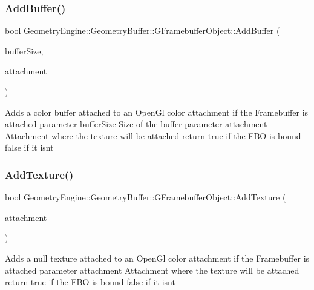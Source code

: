 \subsubsection{\texorpdfstring{AddBuffer()}{AddBuffer()}}
{\footnotesize\ttfamily bool Geometry\+Engine\+::\+Geometry\+Buffer\+::\+G\+Framebuffer\+Object\+::\+Add\+Buffer (\begin{DoxyParamCaption}\item[{const Q\+Vector2D \&}]{buffer\+Size,  }\item[{G\+Framebuffer\+Commons\+::\+G\+\_\+\+C\+O\+L\+O\+R\+\_\+\+A\+T\+T\+A\+C\+H\+M\+E\+N\+TS}]{attachment }\end{DoxyParamCaption})}

Adds a color buffer attached to an Open\+Gl color attachment if the Framebuffer is attached parameter buffer\+Size Size of the buffer parameter attachment Attachment where the texture will be attached return true if the F\+BO is bound false if it isn\textquotesingle{}t \mbox{\label{class_geometry_engine_1_1_geometry_buffer_1_1_g_framebuffer_object_a74233a30be93e8b25f3a957629e47f6e}} 
\subsubsection{\texorpdfstring{AddTexture()}{AddTexture()}\hspace{0.1cm}{\footnotesize\ttfamily [1/3]}}
{\footnotesize\ttfamily bool Geometry\+Engine\+::\+Geometry\+Buffer\+::\+G\+Framebuffer\+Object\+::\+Add\+Texture (\begin{DoxyParamCaption}\item[{G\+Framebuffer\+Commons\+::\+G\+\_\+\+C\+O\+L\+O\+R\+\_\+\+A\+T\+T\+A\+C\+H\+M\+E\+N\+TS}]{attachment }\end{DoxyParamCaption})}

Adds a null texture attached to an Open\+Gl color attachment if the Framebuffer is attached parameter attachment Attachment where the texture will be attached return true if the F\+BO is bound false if it isn\textquotesingle{}t \mbox{\label{class_geometry_engine_1_1_geometry_buffer_1_1_g_framebuffer_object_a2df48d160d1fe45479ec0bbd8585e07c}} 
